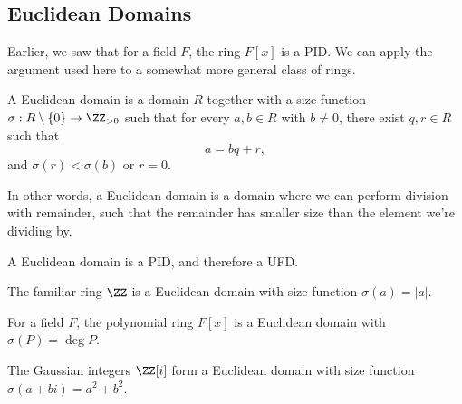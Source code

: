 \subsection{Euclidean Domains}

Earlier, we saw that for a field $F$, the ring $F[x]$ is a PID. We can apply the argument used here to a somewhat more general class of rings. 

\begin{definition}
A Euclidean domain is a domain $R$ together with a size function $\sigma: R \setminus \{0\} \to \ZZ_{>0}$ such that for every $a, b \in R$ with $b \neq 0$, there exist $q, r \in R$ such that \[a = bq + r,\] and $\sigma(r) < \sigma(b)$ or $r = 0$. 
\end{definition}

In other words, a Euclidean domain is a domain where we can perform division with remainder, such that the remainder has smaller size than the element we're dividing by. 


\begin{proposition}\label{euclidean pid}
A Euclidean domain is a PID, and therefore a UFD. 
\end{proposition}

\begin{example}
The familiar ring $\ZZ$ is a Euclidean domain with size function $\sigma(a) = \lvert a\rvert$.
\end{example}

\begin{example}
For a field $F$, the polynomial ring $F[x]$ is a Euclidean domain with $\sigma(P) = \deg P$.
\end{example}

\begin{example}
The Gaussian integers $\ZZ[i]$ form a Euclidean domain with size function $\sigma(a + bi) = a^2 + b^2.$


\end{example}

